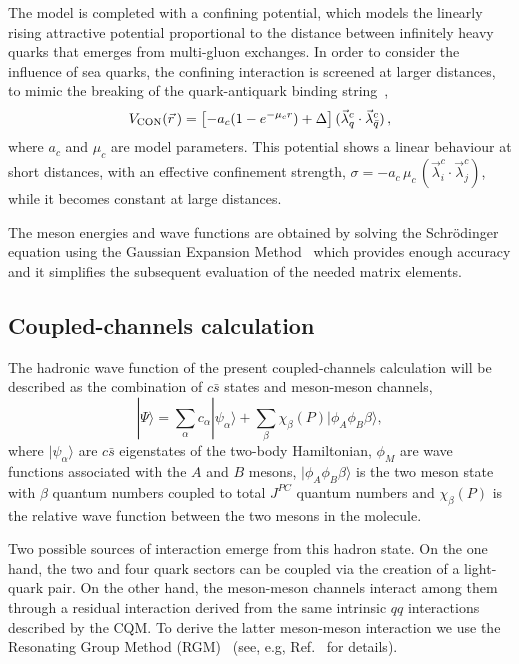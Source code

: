 \documentclass[aps, prd, floatfix, twocolumn, superscriptaddress, nofootinbib]{revtex4-1}
\begin{document}
The model is completed with a confining potential, which models the linearly rising attractive potential
proportional to the distance between infinitely heavy quarks that emerges from multi-gluon exchanges.
In order to consider the influence of sea quarks, the confining interaction is screened at larger distances,
to mimic the breaking of the quark-antiquark binding string~\cite{Bali:2005fu},
\begin{equation}
V_{\rm CON}(\vec{r}\,)=\left[-a_{c}(1-e^{-\mu_{c}r})+\Delta \right]
(\vec{\lambda}_{q}^{c}\cdot\vec{\lambda}_{\bar{q}}^{c}) \,,
\label{eq:conf}
\end{equation}
where $a_{c}$ and $\mu_{c}$ are model parameters. This potential
shows a linear behaviour at short distances, with an effective confinement strength,
$\sigma=-a_{c}\,\mu_{c}\,(\vec{\lambda}^{c}_{i}\cdot \vec{\lambda}^{c}_{j})$,
while it becomes constant at large distances.

The meson energies and wave functions are obtained
by solving the Schr\"odinger equation using the Gaussian Expansion
Method~\cite{Hiyama:2003cu} which provides enough accuracy and it simplifies
the subsequent evaluation of the needed matrix elements.



\subsection{Coupled-channels calculation}
\label{subsec:coupledchannel} 

The hadronic wave function of the present coupled-channels calculation will be described as the
combination of $c\bar s$ states and meson-meson channels,
\begin{equation}
| \Psi \rangle = \sum_\alpha c_\alpha | \psi_\alpha \rangle
+ \sum_\beta \chi_\beta(P) |\phi_A \phi_B \beta \rangle,
\label{ec:funonda}
\end{equation}
where
$|\psi_\alpha\rangle$ are $c\bar{s}$ eigenstates of the two-body
Hamiltonian, $\phi_{M}$ are wave functions associated with the $A$ and $B$ 
mesons, $|\phi_A \phi_B \beta \rangle$ is the two meson state with $\beta$ 
quantum numbers coupled to total $J^{PC}$ quantum numbers and $\chi_\beta(P)$ 
is the relative wave function between the two mesons in the molecule.

Two possible sources of interaction emerge from this hadron state. On the one hand,
the two and four quark sectors can be coupled via the creation of a light-quark pair.
On the other hand, the meson-meson channels interact among them through
a residual interaction derived from the
same intrinsic $qq$ interactions described by the CQM. To derive the latter
meson-meson interaction we use the Resonating
Group Method (RGM)~\cite{Wheeler:1937zza,Tang:1978zz} (see, e.g, Ref.~\cite{Ortega:2016mms} for details).
\end{document}
